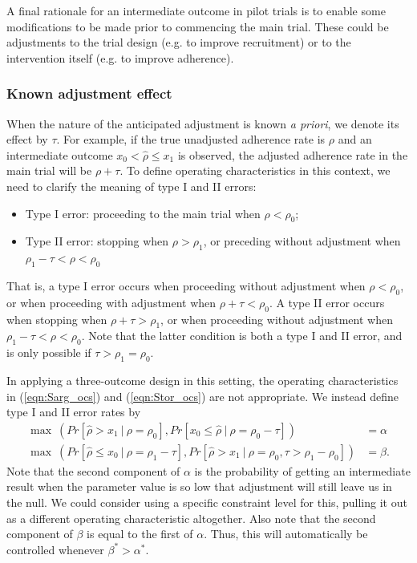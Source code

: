 \documentclass[Crown, times, sagev]{sagej}
\begin{document}
A final rationale for an intermediate outcome in pilot trials is to enable some modifications to be made prior to commencing the main trial. These could be adjustments to the trial design (e.g. to improve recruitment) or to the intervention itself (e.g. to improve adherence).

\subsubsection{Known adjustment effect}

When the nature of the anticipated adjustment is known \emph{a priori}, we denote its effect by $\tau$. For example, if the true unadjusted adherence rate is $\rho$ and an intermediate outcome $x_0 < \hat{\rho} \leq x_1$ is observed, the adjusted adherence rate in the main trial will be $\rho + \tau$. To define operating characteristics in this context, we need to clarify the meaning of type I and II errors:
\begin{itemize}
\item Type I error: proceeding to the main trial when $\rho < \rho_0$;
\item Type II error: stopping when $\rho > \rho_1$, or preceding without adjustment when $\rho_1 - \tau < \rho < \rho_0$
\end{itemize}
That is, a type I error occurs when proceeding without adjustment when $\rho < \rho_0$, or when proceeding with adjustment when $\rho + \tau < \rho_0$. A type II error occurs when stopping when $\rho + \tau > \rho_1$, or when proceeding without adjustment when $\rho_1 - \tau < \rho < \rho_0$. Note that the latter condition is both a type I and II error, and is only possible if $\tau > \rho_1 = \rho_0$. 

In applying a three-outcome design in this setting, the operating characteristics in (\ref{eqn:Sarg_ocs}) and (\ref{eqn:Stor_ocs}) are not appropriate. We instead define type I and II error rates by
\begin{equation}\label{eqn:adj_ocs}
\begin{aligned}
\max ~ (Pr[ \hat{\rho} > x_1 ~|~ \rho = \rho_0 ], Pr[ x_0 \leq \hat{\rho} ~|~ \rho = \rho_0 - \tau]) &= \alpha\\
\max ~ (Pr[ \hat{\rho} \leq x_0 ~|~ \rho = \rho_1 - \tau ], Pr[ \hat{\rho} > x_1 ~|~ \rho = \rho_0, \tau > \rho_1 - \rho_0]) &= \beta.
\end{aligned}
\end{equation}
Note that the second component of $\alpha$ is the probability of getting an intermediate result when the parameter value is so low that adjustment will still leave us in the null. We could consider using a specific constraint level for this, pulling it out as a different operating characteristic altogether. Also note that the second component of $\beta$ is equal to the first of $\alpha$. Thus, this will automatically be controlled whenever $\beta^* > \alpha^*$.
\end{document}
